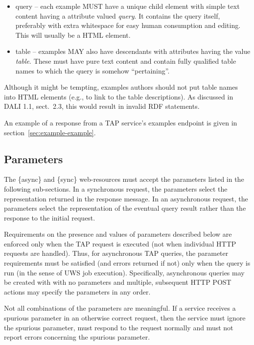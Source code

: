 \documentclass[11pt,letter]{ivoa}
\begin{document}
\begin{itemize}
\item query -- each example MUST have a unique child element with simple text 
content having a  attribute valued {\em query}. It contains the query itself, 
preferably with extra whitespace for easy human consumption and editing. This 
will usually be a HTML  element.
    
\item table -- examples MAY also have descendants with  attributes having 
the value {\em table}. These must have pure text content and contain fully qualified 
table names to which the query is somehow ``pertaining''.
\end{itemize}

Although it might be tempting, examples authors should not put table
names into HTML  elements (e.g., to link to the table
descriptions).  As discussed in DALI 1.1, sect.~2.3, this would result
in invalid RDF statements.

An example of a response from a TAP service's examples endpoint is given
in section~\ref{sec:example-example}.

\subsection{Parameters}
\label{sec:parameters}

The \{async\} and \{sync\} web-resources must accept the parameters listed in 
the following sub-sections. In a synchronous request, the parameters select the 
representation returned in the response message. In an asynchronous request, the 
parameters select the representation of the eventual query result rather than 
the response to the initial request.

Requirements on the presence and values of parameters described below are 
enforced only when the TAP request is executed (not when individual HTTP 
requests are handled). Thus, for asynchronous TAP queries, the parameter 
requirements must be satisfied (and errors returned if not) only when the query 
is run (in the sense of UWS job execution). Specifically, asynchronous 
queries may be created with with no parameters and multiple, subsequent HTTP 
POST actions may specify the parameters in any order.

Not all combinations of the parameters are meaningful. If a 
service receives a spurious parameter in an otherwise correct request, then the 
service must ignore the spurious parameter, must respond to the request normally 
and must not report errors concerning the spurious parameter.
\end{document}
